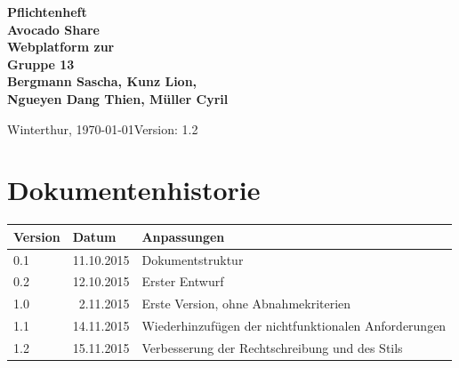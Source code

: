 \documentclass{avocado}
\title{\title}
\author{\autorA \and \autorB \and \autorC \and \autorD \and \autorD}
\newcommand{\titel}{Avocado Share}
\newcommand{\doctype}{Pflichtenheft}
\newcommand{\untertitel}{Webplatform zur }
\newcommand{\datum}{\today}
\newcommand{\team}{Gruppe 13}
\newcommand{\autorA}{Bergmann Sascha}
\newcommand{\autorB}{Kunz Lion}
\newcommand{\autorC}{Ngueyen Dang Thien}
\newcommand{\autorD}{Müller Cyril}
\newcommand{\ort}{Winterthur}
\newcommand{\dozent}{}
\newcommand{\betreuer}{}
\newcommand{\version}{1.2}
\begin{document}
\thispagestyle{plain}

\begin{titlepage}
    \begin{flushleft}
        \vspace*{1cm}
        \textbf{
            \hspace{-0.12cm}\LARGE{\doctype}\\
            \Huge{\titel}\\
            \vspace{0.5cm}
            \large{\untertitel}\\
            \vspace{1.5cm}
            \large{\team\\\autorA, \autorB,\\\autorC, \autorD}\\
        }
        \vspace{1cm}
        \vfill
        \large{

            \ort, \datum \hfill Version: \version
        }
    \end{flushleft}
\end{titlepage}



\section*{Dokumentenhistorie}
\begin{tabularx}{\linewidth}{|l|r|X|} \hline
Version & \multicolumn{1}{l|}{Datum} 			& Anpassungen \\ \hline
0.1 & 11.10.2015		& Dokumentstruktur \\ \hline
0.2	& 12.10.2015       & Erster Entwurf  \\ \hline
1.0 &  2.11.2015		& Erste Version, ohne Abnahmekriterien \\ \hline
1.1 & 14.11.2015        & Wiederhinzufügen der nichtfunktionalen Anforderungen \\ \hline
1.2 & 15.11.2015        & Verbesserung der Rechtschreibung und des Stils\\ \hline
\end{tabularx}
\vfill
\end{document}
